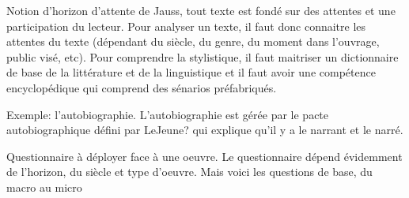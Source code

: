 \documentclass[a4paper]{report}
\theoremstyle{definition}
\theoremstyle{remark}
\begin{document}
Notion d'horizon d'attente de Jauss, tout texte est fondé sur des attentes et une participation du lecteur. Pour analyser un texte, il faut donc connaitre les attentes du texte (dépendant du siècle, du genre, du moment dans l'ouvrage, public visé, etc). Pour comprendre la stylistique, il faut maitriser un dictionnaire de base de la littérature et de la linguistique et il faut avoir une compétence encyclopédique qui comprend des sénarios préfabriqués. \par 

Exemple: l'autobiographie. L'autobiographie est gérée par le pacte autobiographique défini par LeJeune? qui explique qu'il y a le narrant et le narré. \par 

Questionnaire à déployer face à une oeuvre. Le questionnaire dépend évidemment de l'horizon, du siècle et type d'oeuvre. Mais voici les questions de base, du macro au micro
\end{document}
